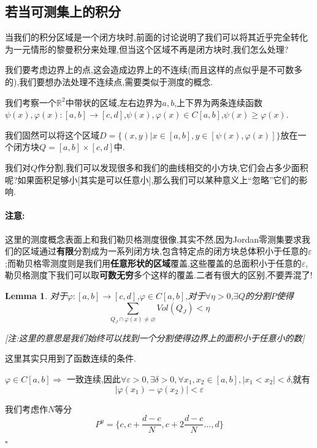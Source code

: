 \documentclass[11pt,hyperref,a4paper,UTF8]{ctexart}
\newtheorem{lemma}{Lemma}[subsection]
\newenvironment{cproof}{%
\heiti{证明}\kaishu
}{%
  \hfill $\square$
  \par\bigskip
}
\newcommand{\RR}{\mathbb{R}}
\begin{document}
\begin{CJK}{UTF8}{gkai}
\subsection{若当可测集上的积分}
当我们的积分区域是一个闭方块时,前面的讨论说明了我们可以将其近乎完全转化为一元情形的黎曼积分来处理,但当这个区域不再是闭方块时,我们怎么处理?

我们要考虑边界上的点,这会造成边界上的不连续(而且这样的点似乎是不可数多的),我们要想办法处理不连续点,需要类似于测度的概念.

我们考察一个$\RR^2$中带状的区域,左右边界为$a,b$,上下界为两条连续函数$\psi(x),\varphi(x) : [a,b] \to [c,d]$,$\psi(x),\varphi(x) \in C[a,b]$,$\psi(x) \geq \varphi(x)$.

我们固然可以将这个区域$D = \{(x,y) | x \in [a,b],y \in [\psi(x),\varphi(x)]\}$放在一个闭方块$Q  = [a,b] \times [c,d]$中.

我们对$Q$作分割,我们可以发现很多和我们的曲线相交的小方块,它们会占多少面积呢?如果面积足够小[其实是可以任意小],那么我们可以某种意义上``忽略''它们的影响.\\

\paragraph{注意:\\}
这里的测度概念表面上和我们勒贝格测度很像,其实不然,因为Jordan零测集要求我们的区域通过\textbf{有限}分割成为一系列闭方块,包含特定点的闭方块总体积小于任意的$\varepsilon$;而勒贝格零测度则是我们用\textbf{任意形状的区域}覆盖,这些覆盖的总面积小于任意的$\varepsilon$,勒贝格测度下我们可以取\textbf{可数无穷}多个这样的覆盖.二者有很大的区别,不要弄混了!

\begin{lemma}
  对于$\varphi: [a,b] \to [c,d]$,$\varphi \in C[a,b]$,对于$\forall \eta > 0$,$\exists Q$的分割$P$使得
  \[\sum_{Q_J \cap \varphi(x) \neq \varnothing} Vol(Q_J) < \eta\]

  [注:这里的意思是我们始终可以找到一个分割使得边界上的面积小于任意小的数]
\end{lemma}

\begin{cproof}
  这里其实只用到了函数连续的条件.

  $\varphi \in C[a,b] \Rightarrow$ 一致连续,因此$\forall \varepsilon > 0,\exists \delta > 0, \forall x_1,x_2 \in [a,b],|x_1 < x_2| < \delta$,就有
  \[|\varphi(x_1) - \varphi(x_2)| < \varepsilon\]

  我们考虑作$N$等分
  \[P^y = \{c,c + \frac{d - c}{N} ,c + 2\frac{d - c}{N} \ldots,d\}\]


\end{cproof}
\end{CJK}
\end{document}
